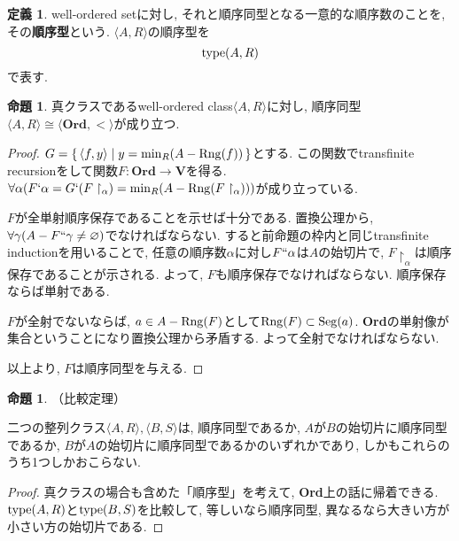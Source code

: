 \documentclass[a4paper, twoside]{bxjsarticle}
\theoremstyle{definition}
\newtheorem{prop}[thm]{命題}
\newtheorem{defn}[thm]{定義}
\begin{document}
    \begin{defn}
        well-ordered setに対し, それと順序同型となる一意的な順序数のことを, その\textbf{順序型}という. $\langle A, R\rangle$の順序型を\[{\rm type}(A, R)\]で表す.
    \end{defn}
    \begin{prop}\label{ordinalthm2}
        真クラスであるwell-ordered class$\langle A, R\rangle$に対し, 順序同型$\langle A, R\rangle \cong\langle\textbf{Ord}, <\rangle$が成り立つ.
    \end{prop}
    \begin{proof}
        $G=\set{\langle f, y\rangle|y={\rm min}_R(A-{\rm Rng}(f))}$とする. この関数でtransfinite recursionをして関数$F\colon \textbf{Ord}\to\textbf{V}$を得る. $\forall \alpha (F`\alpha=G`(F\restriction_\alpha)={\rm min}_R(A-{\rm Rng}(F\restriction_\alpha)))$が成り立っている.
        
        $F$が全単射順序保存であることを示せば十分である. 置換公理から, $\forall \gamma(A-F``\gamma \neq\varnothing)$でなければならない. すると前命題の枠内と同じtransfinite inductionを用いることで, 任意の順序数$\alpha$に対し$F``\alpha$は$A$の始切片で, $F\restriction_\alpha$は順序保存であることが示される. よって, $F$も順序保存でなければならない. 順序保存ならば単射である.
        
        $F$が全射でないならば, $a\in A-{\rm Rng}(F)$として${\rm Rng}(F)\subset {\rm Seg}(a)$. \textbf{Ord}の単射像が集合ということになり置換公理から矛盾する. よって全射でなければならない.
        
        以上より, $F$は順序同型を与える.
    \end{proof}
    \begin{prop}
        （比較定理）
        
        二つの整列クラス$\langle A, R\rangle, \langle B, S\rangle$は, 順序同型であるか, $A$が$B$の始切片に順序同型であるか, $B$が$A$の始切片に順序同型であるかのいずれかであり, しかもこれらのうち1つしかおこらない. 
    \end{prop}
    \begin{proof}
        真クラスの場合も含めた「順序型」を考えて, \textbf{Ord}上の話に帰着できる. ${\rm type}(A, R)$と${\rm type}(B, S)$を比較して, 等しいなら順序同型, 異なるなら大きい方が小さい方の始切片である.
    \end{proof}
\end{document}
